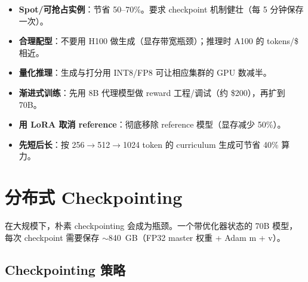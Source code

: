\begin{itemize}
  \item \textbf{Spot/可抢占实例}：节省 50--70\%。要求 checkpoint 机制健壮（每 5 分钟保存一次）。
  \item \textbf{合理配型}：不要用 H100 做生成（显存带宽瓶颈）；推理时 A100 的 tokens/\$ 相近。
  \item \textbf{量化推理}：生成与打分用 INT8/FP8 可让相应集群的 GPU 数减半。
  \item \textbf{渐进式训练}：先用 8B 代理模型做 reward 工程/调试（约 \$200），再扩到 70B。
  \item \textbf{用 LoRA 取消 reference}：彻底移除 reference 模型（显存减少 50\%）。
  \item \textbf{先短后长}：按 256$\rightarrow$512$\rightarrow$1024 token 的 curriculum 生成可节省 40\% 算力。
\end{itemize}

\section{分布式 Checkpointing}
\label{sec:checkpointing}

在大规模下，朴素 checkpointing 会成为瓶颈。一个带优化器状态的 70B 模型，每次 checkpoint 需要保存 $\sim$840~GB（FP32 master 权重 + Adam m + v）。

\subsection{Checkpointing 策略}
\label{checkpointing-strategies}


